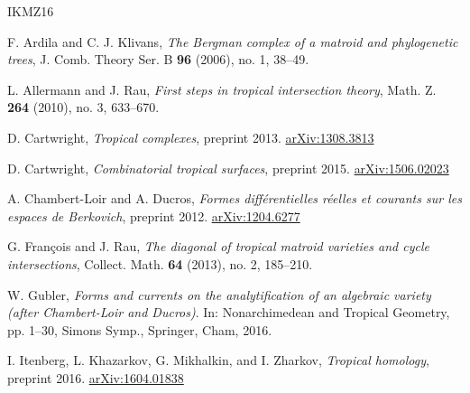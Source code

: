 \documentclass[11pt]{article}
\numberwithin{equation}{numsection}
\begin{document}
\providecommand{\bysame}{\leavevmode\hbox to3em{\hrulefill}\thinspace}
%
%





\def\cprime{$'$}
\begin{thebibliography}{IKMZ16}

F. Ardila and C. J. Klivans,
\emph{The {B}ergman complex of a matroid and phylogenetic trees},
J. Comb. Theory Ser. B {\bf 96} (2006), no. 1, 38--49.

L. Allermann and J. Rau,
\emph{First steps in tropical intersection theory},
Math. Z. {\bf 264} (2010), no. 3, 633--670.

D. Cartwright,
\emph{Tropical complexes}, preprint 2013.
\href{https://arxiv.org/abs/1308.3813}{arXiv:1308.3813}

D. Cartwright,
\emph{Combinatorial tropical surfaces}, preprint 2015.
\href{https://arxiv.org/abs/1506.02023}{arXiv:1506.02023}

A. Chambert-Loir and A. Ducros,
\emph{Formes diff\'{e}rentielles r\'{e}elles et courants sur les espaces de
  {B}erkovich}, preprint 2012.
  \href{https://arxiv.org/abs/1204.6277}{arXiv:1204.6277}

G. {Fran\c{c}ois} and J. {Rau},
\emph{The diagonal of tropical matroid varieties and cycle intersections},
Collect. Math. {\bf 64} (2013), no. 2, 185--210.

W. Gubler,
\emph{Forms and currents on the analytification of an algebraic variety
  (after {C}hambert-{L}oir and {D}ucros)}.
In: Nonarchimedean and Tropical Geometry, pp. 1--30, Simons Symp., Springer, Cham, 2016.

I. Itenberg, L. Khazarkov, G. Mikhalkin, and I. Zharkov,
\emph{Tropical homology}, preprint 2016.
  \href{https://arxiv.org/abs/1604.01838}{arXiv:1604.01838}


\end{thebibliography}
\end{document}
